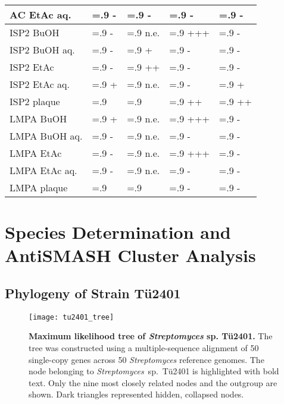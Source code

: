 \begin{table}[htbp]
\begin{tabularx}{\textwidth}{>{\hsize=1.4\hsize}X>{\hsize=.9\hsize}X>{\hsize=.9\hsize}X>{\hsize=.9\hsize}X>{\hsize=.9\hsize}X}
            AC EtAc aq.     & -     & -     & -     & -    \\
            \midrule
            ISP2 BuOH       & -     & n.e.  & +++   & -    \\
            ISP2 BuOH aq.   & -     & +     & -     & -    \\
            ISP2 EtAc       & -     & ++    & -     & -    \\
            ISP2 EtAc aq.   & +     & n.e.  & -     & +    \\
            ISP2 plaque     &       &       & ++    & ++   \\
            \midrule
            LMPA BuOH       & +     & n.e.  & +++   & -    \\
            LMPA BuOH aq.   & -     & n.e.  & -     & -    \\
            LMPA EtAc       & -     & n.e.  & +++   & -    \\
            LMPA EtAc aq.   & -     & n.e.  & -     & -    \\
            LMPA plaque     &       &       & -     & -    \\
            \bottomrule
        \end{tabularx}
    \end{table}


\section{Species Determination and AntiSMASH Cluster Analysis} %
\label{sec:species_antismash}

    \subsection{Phylogeny of Strain Tü2401} %
    \label{sub:phylogeny_of_strain_tue2401}

	\begin{figure}[htbp]
		\texttt{[image: tu2401\_tree]}
		\caption[Maximum likelihood tree of \emph{Streptomyces} sp. Tü2401.]{%
			\textbf{Maximum likelihood tree of \emph{Streptomyces} sp. Tü2401.}
			The tree was constructed using a multiple-sequence alignment of 50 single-copy genes across 50 \textit{Streptomyces} reference genomes.
			The node belonging to \textit{Streptomyces}~sp.~Tü2401 is highlighted with bold text.
			Only the nine most closely related nodes and the outgroup are shown.
			Dark triangles represented hidden, collapsed nodes.}
		\label{fig:phylo_tree} 
	\end{figure}

